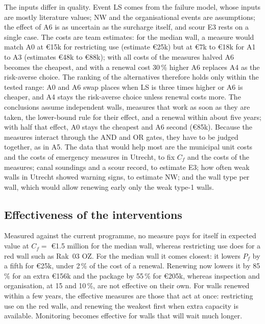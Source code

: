 The inputs differ in quality. Event LS comes from the failure model, whose
inputs are mostly literature values; NW and the organisational events are
assumptions; the effect of A6 is as uncertain as the surcharge itself, and
scour E3 rests on a single case. The costs are team estimates: for the median
wall, a measure would match A0 at \euro15k for restricting use (estimate
\euro25k) but at \euro7k to \euro18k for A1 to A3 (estimates \euro48k to
\euro88k); with all costs of the measures halved A6 becomes the cheapest, and
with a renewal cost 30\,\% higher A6 replaces A4 as the risk-averse choice.
The ranking of the alternatives therefore holds only within the tested range:
A0 and A6 swap places when LS is three times higher or A6 is cheaper, and A4
stays the risk-averse choice unless renewal costs more. The conclusions assume
independent walls, measures that work as soon as they are taken, the
lower-bound rule for their effect, and a renewal within about five years; with
half that effect, A0 stays the cheapest and A6 second (\euro85k).
Because the measures interact through the AND and OR gates, they have to be
judged together, as in A5. The data that would help most are the municipal unit
costs and the costs of emergency measures in Utrecht, to fix $C_f$ and the
costs of the measures; canal
soundings and a scour record, to estimate E3; how often weak walls in Utrecht
showed warning signs, to estimate NW; and the wall type per wall, which would
allow renewing early only the weak type-1 walls.

\subsection{Effectiveness of the interventions}\label{sec:to-effectiveness}

Measured against the current programme, no measure pays for itself in expected
value at $C_f = $ \euro1.5 million for the median wall, whereas restricting use
does for a red wall such as Rak~03 OZ. For the median wall it comes closest: it lowers $P_f$ by a fifth for
\euro25k, under 2\,\% of the cost of a renewal. Renewing now lowers it by 85\,\%
for an extra \euro156k and the package by 55\,\% for \euro205k, whereas
inspection and organisation, at 15 and 10\,\%, are not effective on their own.
For walls renewed within a few years, the effective measures are those that
act at once: restricting use on the red walls, and renewing the weakest first
when extra capacity is available. Monitoring becomes effective for walls that
will wait much longer.

